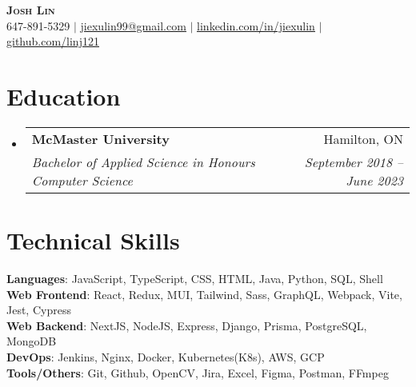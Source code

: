 \documentclass[letterpaper,11pt]{article}
\makeatletter
\newcommand{\resumeSubheading}[4]{
  \vspace{-2pt}\item
    \begin{tabular*}{0.97\textwidth}[t]{l@{\extracolsep{\fill}}r}
      \textbf{#1} & #2 \\
      \textit{\small#3} & \textit{\small #4} \\
    \end{tabular*}\vspace{-7pt}
}
\newcommand{\resumeSubHeadingListStart}{\begin{itemize}[leftmargin=0.15in, label={}]}
\newcommand{\resumeSubHeadingListEnd}{\end{itemize}}
\makeatother
\begin{document}

\begin{center}
    \textbf{\Huge \scshape Josh Lin} \\ \vspace{1pt}
    \small 647-891-5329 $|$ \href{mailto:jiexulin99@gmail.com}{\underline{jiexulin99@gmail.com}} $|$ 
    \href{https://linkedin.com/in/jiexulin}{\underline{linkedin.com/in/jiexulin}} $|$
    \href{https://github.com/linj121}{\underline{github.com/linj121}}
\end{center}


\section{Education}
  \resumeSubHeadingListStart
    \resumeSubheading
      {McMaster University}{Hamilton, ON}
      {Bachelor of Applied Science in Honours Computer Science}{September 2018 -- June 2023}
  \resumeSubHeadingListEnd

%
\section{Technical Skills}
 \begin{itemize}[leftmargin=0.15in, label={}]
    \small{\item{
      \textbf{Languages}{: JavaScript, TypeScript, CSS, HTML, Java, Python,   SQL, Shell} \\
      \textbf{Web Frontend}{: React, Redux, MUI, Tailwind, Sass, GraphQL,   Webpack, Vite, Jest, Cypress} \\
      \textbf{Web Backend}{: NextJS, NodeJS, Express, Django, Prisma,   PostgreSQL, MongoDB}\\
      \textbf{DevOps}{: Jenkins, Nginx, Docker, Kubernetes(K8s), AWS, GCP} \\
      \textbf{Tools/Others}{: Git, Github, OpenCV, Jira, Excel, Figma,   Postman, FFmpeg} \\
     }}
 \end{itemize}
\end{document}
